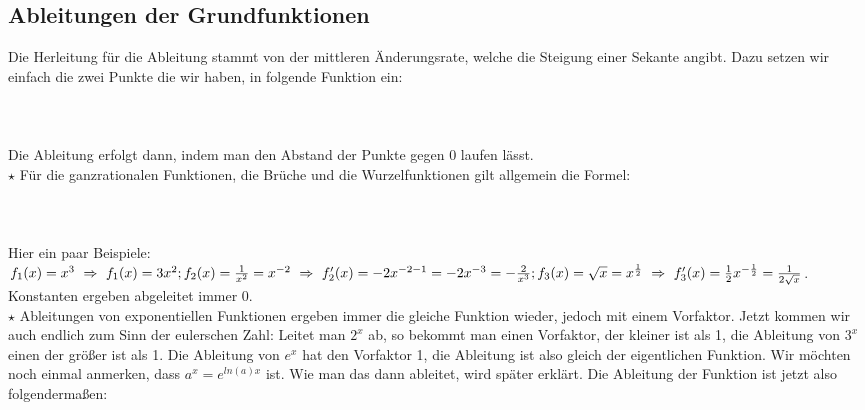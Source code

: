 \subsection{Ableitungen der Grundfunktionen}
	Die Herleitung für die Ableitung stammt von der mittleren Änderungsrate, welche
	die Steigung einer Sekante angibt. Dazu setzen wir einfach die zwei Punkte die
	wir haben, in folgende Funktion ein:
	\\ \\
	\\ \\
	Die Ableitung erfolgt dann, indem man den Abstand der Punkte
	gegen 0 laufen lässt.\\

	\(\star\) Für die ganzrationalen Funktionen, die Brüche und die
	Wurzelfunktionen gilt allgemein die Formel:
	\\ \\
	\formel{\[f(x)=x^n\ \Rightarrow\ f'(x)=n\cdot x^{n-1}\]}
	\\ \\
	Hier ein paar Beispiele: \(f_1(x)=x^3\ \Rightarrow\ f_1(x)=3x^2;\\
	f_2(x)=\frac{1}{x^2}=x^{-2}\ \Rightarrow\
	f_2'(x)=-2x^{-2-1}=-2x^{-3}=-\frac{2}{x^3};\\
	f_3(x)=\sqrt{x}=x^{\frac{1}{2}}\
	\Rightarrow\ f_3'(x)=\frac{1}{2}x^{-\frac{1}{2}}=\frac{1}{2\sqrt{x}}\).\\
	Konstanten ergeben abgeleitet immer 0.\\

	\(\star\) Ableitungen von exponentiellen Funktionen ergeben immer die gleiche
	Funktion wieder, jedoch mit einem Vorfaktor. Jetzt kommen wir auch endlich zum
	Sinn der eulerschen Zahl: Leitet man \(2^x\) ab, so bekommt man einen
	Vorfaktor, der kleiner ist als 1, die Ableitung von \(3^x\) einen der größer
	ist als 1. Die Ableitung von \(e^x\) hat den Vorfaktor 1, die Ableitung ist
	also gleich der eigentlichen Funktion. Wir möchten noch einmal anmerken, dass
	\(a^x=e^{ln(a)x}\) ist. Wie man das dann ableitet, wird später erklärt. Die
	Ableitung der Funktion ist jetzt also folgendermaßen:
	\\ \\
	\formel{\[f(x)=e^x\ \Rightarrow\ f'(x)=e^x\]}


